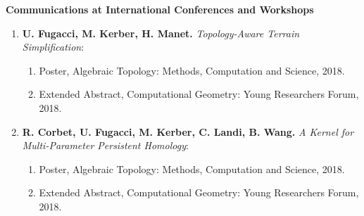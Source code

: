 \documentclass[11pt]{article}
\begin{document}
\noindent
{\bf Communications at International Conferences and Workshops}
\begin{enumerate}

\item {\bf U. Fugacci, M. Kerber, H. Manet.} {\em Topology-Aware Terrain Simplification}:
\begin{enumerate}
  \item Poster, Algebraic Topology: Methods, Computation and Science, 2018.
  \item Extended Abstract, Computational Geometry: Young Researchers Forum, 2018.
\end{enumerate}

\item {\bf R. Corbet, U. Fugacci, M. Kerber, C. Landi, B. Wang.} {\em A Kernel for Multi-Parameter Persistent Homology}:
\begin{enumerate}
  \item Poster, Algebraic Topology: Methods, Computation and Science, 2018.
  \item Extended Abstract, Computational Geometry: Young Researchers Forum, 2018.
\end{enumerate}



\end{enumerate}
\vspace*{1ex}
\end{document}
